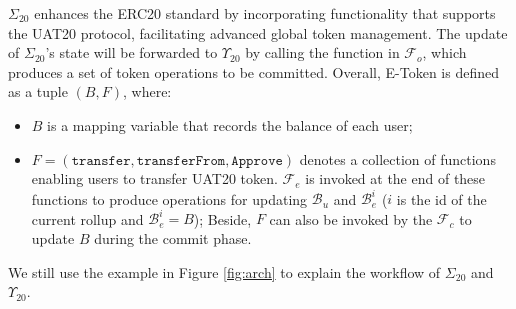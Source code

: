 \begin{defn} $\Sigma_{20}$ enhances the ERC20 standard by incorporating functionality that supports the UAT20 protocol, facilitating advanced global token management. The update of $\Sigma_{20}$'s state will be forwarded to $\Upsilon_{20}$ by calling the function in $\mathcal{F}_o$, which produces a set of token operations to be committed.
Overall, E-Token is defined as a tuple $(B, F)$, where:

\begin{itemize}[leftmargin=*]
    \item $B$ is a mapping variable that records the balance of each user; 
    \item $F = (\mathtt{transfer}, \mathtt{transferFrom}, \mathtt{Approve})$ denotes a collection of functions enabling users to transfer UAT20 token.
    $\mathcal{F}_e$ is invoked at the end of these functions to produce operations for updating $\mathcal{B}_u$ and $\mathcal{B}^i_e$ ($i$ is the id of the current rollup and $\mathcal{B}^i_e = B$); Beside, $F$ can also be invoked by the $\mathcal{F}_c$ to update $B$ during the commit phase.
\end{itemize}




\end{defn}

We still use the example in Figure \ref{fig:arch} to explain the workflow of $\Sigma_{20}$ and $\Upsilon_{20}$. 




